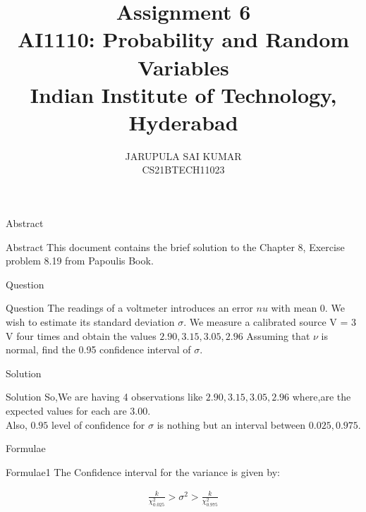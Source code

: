 \documentclass{beamer}
\title{\textbf{Assignment 6\\ \Large AI1110: Probability and Random Variables \\ \large Indian Institute of Technology, Hyderabad}}
\author{JARUPULA SAI KUMAR\\ CS21BTECH11023}
\begin{document}
\begin{frame}
      \titlepage
\end{frame}



\begin{frame}{Abstract}
     \begin{block}{Abstract}
          This document contains the brief solution to the  Chapter 8, Exercise problem 8.19 from Papoulis Book.
      \end{block}
\end{frame}



\begin{frame}{Question}
      \begin{block}{Question}
           The readings of a voltmeter introduces an error $nu$ with mean $0$. We wish to estimate its standard deviation $\sigma$. We measure a calibrated source V = 3 V four times and obtain the values $ 2.90, 3.15 , 3.05, 2.96 $ Assuming that $\nu$ is normal, find the 0.95 confidence interval of $\sigma$.
      \end{block}
\end{frame}



\begin{frame}{Solution}
       \begin{block}{Solution}
        So,We are having 4 observations like  $ 2.90, 3.15 , 3.05, 2.96 $ where,are the expected values for each are $ 3.00 $. \\
        Also, $ 0.95 $ level of confidence for $\sigma$ is nothing but an interval between $ 0.025 , 0.975 $. 
       \end{block}
\end{frame}



\begin{frame}{Formulae}
    \begin{block}{Formulae1}
            The Confidence interval for the variance is given by:
            
               \begin{align}
                   \frac{k}{\chi^{2}_{0.025}} > \sigma^{2} > \frac{k}{\chi^{2}_{0.975}}
                   \label{form_1}
               \end{align}
               
    \end{block}
\end{frame}
\end{document}
